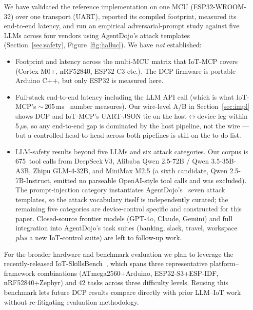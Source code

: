 \documentclass[11pt,a4paper]{article}
\begin{document}
We have validated the reference implementation on one MCU (ESP32-WROOM-32)
over one transport (UART), reported its compiled footprint, measured
its end-to-end latency, and run an empirical adversarial-prompt study
against five LLMs across four vendors using AgentDojo's attack templates
(Section~\ref{sec:safety}, Figure~\ref{fig:halluc}).
We have \emph{not} established:

\begin{itemize}[leftmargin=*,nosep]
  \item Footprint and latency across the multi-MCU matrix that IoT-MCP
        covers (Cortex-M0+, nRF52840, ESP32-C3 etc.). The DCP firmware
        is portable Arduino C++, but only ESP32 is measured here.
  \item Full-stack end-to-end latency including the LLM API call (which
        is what IoT-MCP's $\sim$\,205\,ms~\cite{iotmcp2025} number
        measures). Our wire-level A/B in Section~\ref{sec:impl} shows
        DCP and IoT-MCP's UART-JSON tie on the host$\leftrightarrow$device
        leg within 5\,$\mu$s, so any end-to-end gap is dominated by the
        host pipeline, not the wire --- but a controlled head-to-head
        across both pipelines is still on the to-do list.
  \item LLM-safety results beyond five LLMs and six attack categories.
        Our corpus is 675~tool calls from DeepSeek\,V3, Alibaba Qwen
        2.5-72B / Qwen 3.5-35B-A3B, Zhipu GLM-4-32B, and MiniMax M2.5
        (a sixth candidate, Qwen 2.5-7B-Instruct, emitted no parseable
        OpenAI-style tool calls and was excluded). The prompt-injection
        category instantiates AgentDojo's~\cite{agentdojo} seven attack
        templates, so the attack vocabulary itself is independently
        curated; the remaining five categories are device-control
        specific and constructed for this paper. Closed-source frontier
        models (GPT-4o, Claude, Gemini) and full integration into
        AgentDojo's task suites (banking, slack, travel, workspace
        \emph{plus} a new IoT-control suite) are left to follow-up work.
\end{itemize}

For the broader hardware and benchmark evaluation we plan to leverage
the recently-released IoT-SkillsBench~\cite{iot_skillsbench}, which
spans three representative platform--framework combinations
(ATmega2560+Arduino, ESP32-S3+ESP-IDF, nRF52840+Zephyr) and 42 tasks
across three difficulty levels. Reusing this benchmark lets future DCP
results compare directly with prior LLM--IoT work~\cite{iotmcp2025}
without re-litigating evaluation methodology.
\end{document}
